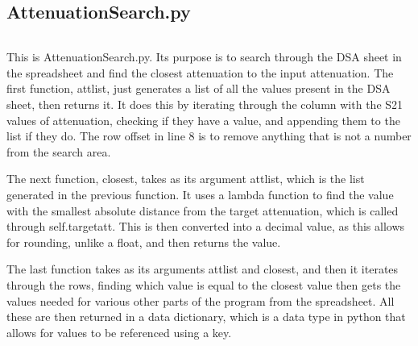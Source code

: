 \documentclass{article}
\begin{document}
\subsection{AttenuationSearch.py}
\inputminted[linenos, breaklines]{python}{../src/AttenuationSearch.py}
This is AttenuationSearch.py.
Its purpose is to search through the DSA sheet in the spreadsheet and find the closest attenuation
to the input attenuation. The first function, attlist, just generates a list of all the values
present in the DSA sheet, then returns it. It does this by iterating through the column with the S21
values of attenuation, checking if they have a value, and appending them to the list if they do. The
row offset in line 8 is to remove anything that is not a number from the search area.\par The next
function, closest, takes as its argument attlist, which is the list generated in the previous
function. It uses a lambda function to find the value with the smallest absolute distance from the
target attenuation, which is called through self.targetatt. This is then converted into a decimal
value, as this allows for rounding, unlike a float, and then returns the value.\par The last
function takes as its arguments attlist and closest, and then it iterates through the rows, finding
which value is equal to the closest value then gets the values needed for various other parts of the
program from the spreadsheet. All these are then returned in a data dictionary, which is a data type
in python that allows for values to be referenced using a key.
\end{document}
